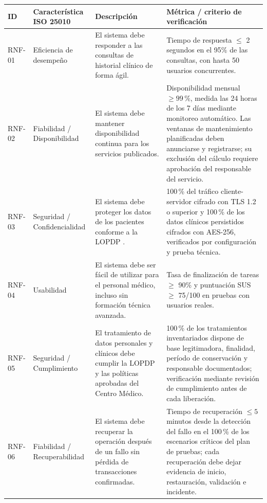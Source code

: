 \documentclass[11pt,a4paper]{article}
\begin{document}
	
	\begin{longtable}{
			p{}
			p{}
			p{}
			p{}
		}
		
		\toprule
		\textbf{ID} &
		\textbf{Característica ISO 25010} &
		\textbf{Descripción} &
		\textbf{Métrica / criterio de verificación} \\
		\midrule
		\endhead
		
		RNF-01 &
		Eficiencia de desempeño &
		El sistema debe responder a las consultas de historial clínico de forma ágil. &
		Tiempo de respuesta \(\leq\) 2 segundos en el 95\% de las consultas, con hasta 50 usuarios concurrentes. \\
		
		RNF-02 &
		Fiabilidad / Disponibilidad &
		El sistema debe mantener disponibilidad continua para los servicios publicados. &
		Disponibilidad mensual \(\geq 99\,\%\), medida las 24 horas de los 7 días mediante monitoreo automático. Las ventanas de mantenimiento planificadas deben anunciarse y registrarse; su exclusión del cálculo requiere aprobación del responsable del servicio. \\
		
		RNF-03 &
		Seguridad / Confidencialidad &
		El sistema debe proteger los datos de los pacientes conforme a la LOPDP \cite{loppd}. &
		100\,\% del tráfico cliente-servidor cifrado con TLS 1.2 o superior y 100\,\% de los datos clínicos persistidos cifrados con AES-256, verificados por configuración y prueba técnica. \\
		
		RNF-04 &
		Usabilidad &
		El sistema debe ser fácil de utilizar para el personal médico, incluso sin formación técnica avanzada. &
		Tasa de finalización de tareas \(\geq\) 90\% y puntuación SUS \(\geq\) 75/100 en pruebas con usuarios reales. \\
		
		RNF-05 &
		Seguridad / Cumplimiento &
		El tratamiento de datos personales y clínicos debe cumplir la LOPDP y las políticas aprobadas del Centro Médico. &
		100\,\% de los tratamientos inventariados dispone de base legitimadora, finalidad, período de conservación y responsable documentados; verificación mediante revisión de cumplimiento antes de cada liberación. \\
		
		RNF-06 &
		Fiabilidad / Recuperabilidad &
		El sistema debe recuperar la operación después de un fallo sin pérdida de transacciones confirmadas. &
		Tiempo de recuperación \(\leq 5\) minutos desde la detección del fallo en el 100\,\% de los escenarios críticos del plan de pruebas; cada recuperación debe dejar evidencia de inicio, restauración, validación e incidente. \\
		

\end{longtable}
\end{document}
